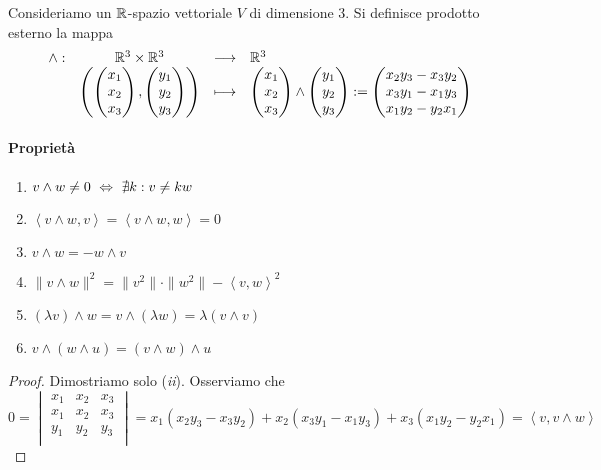 \documentclass{article}     %
\newcommand{\scp}[1][\cdot,\cdot]{\left\langle #1 \right\rangle}
\begin{document}
\begin{boxdef}
    Consideriamo un $\mathbb{R}$-spazio vettoriale $V$ di dimensione 3. Si definisce prodotto esterno la mappa 
    \[\begin{array}{cccl} \wedge : & \mathbb{R}^3\times \mathbb{R}^3 & \longrightarrow & \mathbb{R}^3 \\ & \left(\begin{pmatrix}
        x_1\\x_2\\x_3
    \end{pmatrix}, \begin{pmatrix}
        y_1\\y_2\\y_3
    \end{pmatrix}\right) & \longmapsto & \begin{pmatrix}
        x_1\\x_2\\x_3
    \end{pmatrix}\wedge \begin{pmatrix}
        y_1\\y_2\\y_3
    \end{pmatrix}:=\begin{pmatrix}
        x_2y_3-x_3y_2\\x_3y_1-x_1y_3\\x_1y_2-y_2x_1
    \end{pmatrix} \end{array}\]
\end{boxdef}
\paragraph{Proprietà}
\begin{enumerate}[label={\it\roman*})]
    \item $v\wedge w\neq 0\ \Leftrightarrow\ \nexists k : v\neq kw$
    \item $\scp[v\wedge w, v]= \scp[v\wedge w, w]=0$
    \item $v\wedge w = -w\wedge v$
    \item $\|v\wedge w\|^2=\|v^2\|\cdot\|w^2\|-\scp[v,w]^2$
    \item $(\lambda v)\wedge w = v\wedge (\lambda w)= \lambda (v\wedge v)$
    \item $v\land (w\land u)=(v\land w)\land u$
\end{enumerate}
\begin{proof} Dimostriamo solo (\textit{ii}). Osserviamo che 
    \[0=\begin{vmatrix}
        x_1&x_2&x_3\\
        x_1&x_2&x_3\\
        y_1&y_2&y_3\\
    \end{vmatrix}=x_1(x_2y_3-x_3y_2)+x_2(x_3y_1-x_1y_3)+x_3(x_1y_2-y_2x_1)=\scp[v, v\wedge w]\]
    
\end{proof}
\newpage
\end{document}
